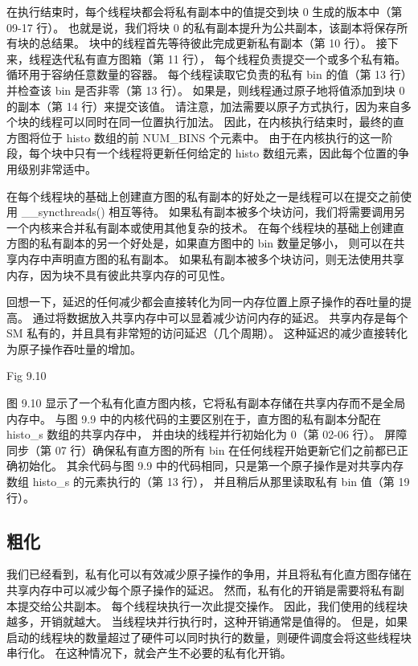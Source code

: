 在执行结束时，每个线程块都会将私有副本中的值提交到块 0 生成的版本中（第 09-17 行）。 
也就是说，我们将块 0 的私有副本提升为公共副本，该副本将保存所有块的总结果。 
块中的线程首先等待彼此完成更新私有副本（第 10 行）。 接下来，线程迭代私有直方图箱（第 11 行），
每个线程负责提交一个或多个私有箱。 循环用于容纳任意数量的容器。 
每个线程读取它负责的私有 bin 的值（第 13 行）并检查该 bin 是否非零（第 13 行）。 
如果是，则线程通过原子地将值添加到块 0 的副本（第 14 行）来提交该值。 
请注意，加法需要以原子方式执行，因为来自多个块的线程可以同时在同一位置执行加法。 
因此，在内核执行结束时，最终的直方图将位于 histo 数组的前 NUM\_BINS 个元素中。 
由于在内核执行的这一阶段，每个块中只有一个线程将更新任何给定的 histo 数组元素，因此每个位置的争用级别非常适中。

在每个线程块的基础上创建直方图的私有副本的好处之一是线程可以在提交之前使用 \_\_syncthreads() 相互等待。 
如果私有副本被多个块访问，我们将需要调用另一个内核来合并私有副本或使用其他复杂的技术。 
在每个线程块的基础上创建直方图的私有副本的另一个好处是，如果直方图中的 bin 数量足够小，
则可以在共享内存中声明直方图的私有副本。 如果私有副本被多个块访问，则无法使用共享内存，因为块不具有彼此共享内存的可见性。

回想一下，延迟的任何减少都会直接转化为同一内存位置上原子操作的吞吐量的提高。 
通过将数据放入共享内存中可以显着减少访问内存的延迟。 共享内存是每个 SM 私有的，并且具有非常短的访问延迟（几个周期）。 
这种延迟的减少直接转化为原子操作吞吐量的增加。

{\color{red} Fig 9.10}

图 9.10 显示了一个私有化直方图内核，它将私有副本存储在共享内存而不是全局内存中。 
与图 9.9 中的内核代码的主要区别在于，直方图的私有副本分配在 histo\_s 数组的共享内存中，
并由块的线程并行初始化为 0（第 02-06 行）。 
屏障同步（第 07 行）确保私有直方图的所有 bin 在任何线程开始更新它们之前都已正确初始化。 
其余代码与图 9.9 中的代码相同，只是第一个原子操作是对共享内存数组 histo\_s 的元素执行的（第 13 行），
并且稍后从那里读取私有 bin 值（第 19 行）。

\subsection{粗化}
我们已经看到，私有化可以有效减少原子操作的争用，并且将私有化直方图存储在共享内存中可以减少每个原子操作的延迟。 
然而，私有化的开销是需要将私有副本提交给公共副本。 每个线程块执行一次此提交操作。 因此，我们使用的线程块越多，开销就越大。 
当线程块并行执行时，这种开销通常是值得的。 
但是，如果启动的线程块的数量超过了硬件可以同时执行的数量，则硬件调度会将这些线程块串行化。 
在这种情况下，就会产生不必要的私有化开销。

